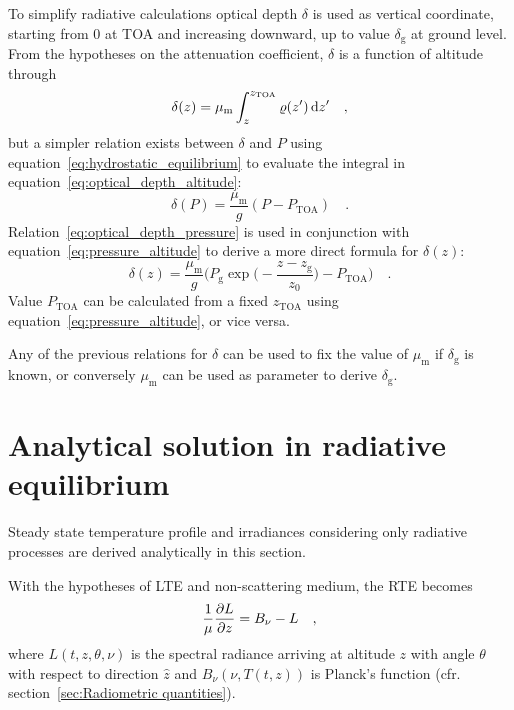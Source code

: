 \documentclass[a4paper,10pt,twocolumn,\classoptions]{article}
\newcommand{\zTOA}{z_\text{TOA}}
\newcommand{\PTOA}{P_\text{TOA}}
\begin{document}
To simplify radiative calculations optical depth $\delta$ is used as vertical coordinate, starting from \num{0} at TOA and increasing downward, up to value $\delta_\text{g}$ at ground level. From the hypotheses on the attenuation coefficient, $\delta$ is a function of altitude through
\begin{equation}
  \label{eq:optical_depth_altitude}
  \delta(z) = \mu_\text{m} \int_{z}^{\zTOA} \varrho(z') \odif{z'}
  \quad ,
\end{equation}
but a simpler relation exists between $\delta$ and $P$ using equation~\eqref{eq:hydrostatic_equilibrium} to evaluate the integral in equation~\eqref{eq:optical_depth_altitude}:
\begin{equation}
  \label{eq:optical_depth_pressure}
  \delta(P) = \frac{\mu_\text{m}}{g} (P - \PTOA)
  \quad .
\end{equation}
Relation~\eqref{eq:optical_depth_pressure} is used in conjunction with equation~\eqref{eq:pressure_altitude} to derive a more direct formula for $\delta(z)$:
\begin{equation}
  \label{eq:optical_depth_altitude_2}
  \delta(z) = \frac{\mu_\text{m}}{g} \bigg( P_\text{g} \exp{\bigg( - \frac{z - z_\text{g}}{z_0} \bigg)} - \PTOA \bigg)
  \quad .
\end{equation}
Value $\PTOA$ can be calculated from a fixed $\zTOA$ using equation~\eqref{eq:pressure_altitude}, or vice versa.

Any of the previous relations for $\delta$ can be used to fix the value of $\mu_\text{m}$ if $\delta_\text{g}$ is known, or conversely $\mu_\text{m}$ can be used as parameter to derive $\delta_\text{g}$.



\section{Analytical solution in radiative equilibrium}
\label{sec:Analytical solution in radiative equilibrium}
Steady state temperature profile and irradiances considering only radiative processes are derived analytically in this section.

With the hypotheses of LTE and non-scattering medium, the RTE becomes
\begin{equation}
  \label{eq:RTE_analytical}
  \frac{1}{\mu} \pdv{L}{z} = B_\nu - L
  \quad ,
\end{equation}
where $L(t, z, \theta, \nu)$ is the spectral radiance arriving at altitude $z$ with angle $\theta$ with respect to direction $\hat{z}$ and $B_\nu(\nu, T(t,z))$ is Planck's function (cfr. section~\ref{sec:Radiometric quantities}).
\end{document}
